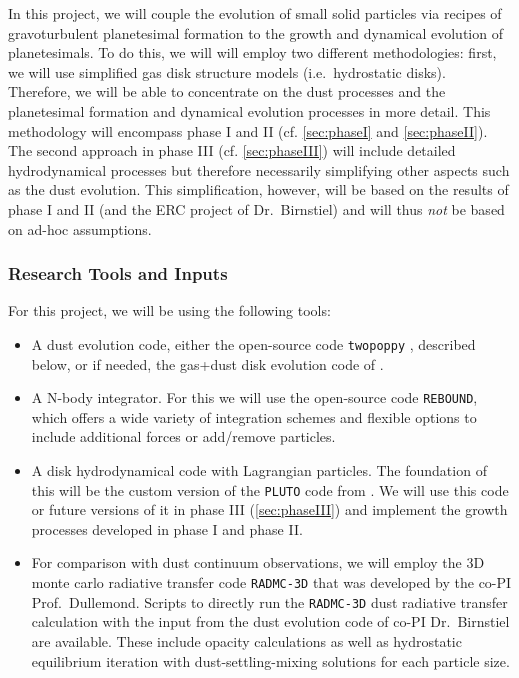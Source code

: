 \documentclass[10pt,fleqn,twoside]{article}
\newcommand{\twopoppy}{\texttt{twopoppy}\xspace}
\newcommand{\rebound}{\texttt{REBOUND}\xspace}
\newcommand{\pluto}{\texttt{PLUTO}\xspace}
\newcommand{\radmc}{\texttt{RADMC-3D}\xspace}
\begin{document}
In this project, we will couple the evolution of small solid particles
via recipes of gravoturbulent planetesimal formation to the growth and
dynamical evolution of planetesimals. To do this, we will will employ
two different methodologies: first, we will use simplified gas disk
structure models (i.e.\ hydrostatic disks). Therefore, we will be able
to concentrate on the dust processes and the planetesimal formation
and dynamical evolution processes in more detail. This methodology
will encompass phase I and II (cf. \autoref{sec:phaseI} and
\autoref{sec:phaseII}). The second approach in phase III (cf.
\autoref{sec:phaseIII}) will include detailed hydrodynamical processes
but therefore necessarily simplifying other aspects such as the dust
evolution. This simplification, however, will be based on the results
of phase I and II (and the ERC project of Dr.\ Birnstiel) and will thus
\textit{not} be based on ad-hoc assumptions.

\subsubsection{Research Tools and Inputs}
For this project, we will be using the following tools:

\begin{itemize}
  \item A dust evolution code, either the open-source code \twopoppy
  \citep{2012A&A...539A.148B}, described below, or if needed, the
  gas+dust disk evolution code of \citet{2010A&A...513A..79B}.
  \item A N-body integrator. For this we will use the open-source code
  \rebound \citep{2012A&A...537A.128R}, which offers a wide variety of integration schemes and
  flexible options to include additional forces or add/remove
  particles.
  \item A disk hydrodynamical code with Lagrangian particles. The
  foundation of this will be the custom version of the \pluto code
  from \citep{2015A&A...584A.110P}. We will use this code or future
  versions of it in phase III (\autoref{sec:phaseIII}) and implement
  the growth processes developed in phase I and phase II.
  \item For comparison with dust continuum observations, we will
  employ the 3D monte carlo radiative transfer code \radmc that was
  developed by the co-PI Prof.\ Dullemond. Scripts to directly run the
  \radmc dust radiative transfer calculation with the input from the
  dust evolution code of co-PI Dr.\ Birnstiel are available. These
  include opacity calculations as well as hydrostatic equilibrium
  iteration with dust-settling-mixing solutions for each particle
  size.
\end{itemize}
\end{document}
